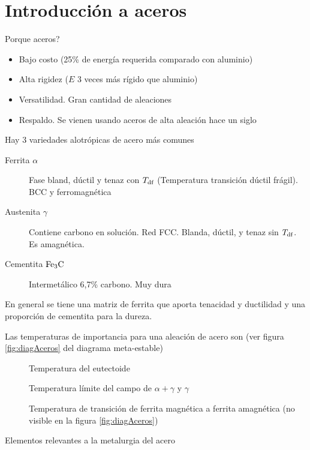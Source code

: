 \section{Introducción a aceros}

Porque aceros?

\begin{itemize}
	\item Bajo costo (25\% de energía requerida comparado con aluminio)
	\item Alta rigidez ($E$ 3 veces más rígido que aluminio)
	\item Versatilidad. Gran cantidad de aleaciones
	\item Respaldo. Se vienen usando aceros de alta aleación hace un siglo
\end{itemize}

Hay 3 variedades alotrópicas de acero más comunes
\begin{description}
	\item[Ferrita $\alpha$] Fase bland, dúctil y tenaz con $T_{\mathrm{df}}$ (Temperatura transición dúctil frágil). BCC y ferromagnética
	\item[Austenita $\gamma$] Contiene carbono en solución. Red FCC. Blanda, dúctil, y tenaz sin $T_{\mathrm{df}}$. Es amagnética.
	\item[Cementita $\mathrm{Fe}_3 \mathrm{C}$] Intermetálico 6,7\% carbono. Muy dura   
\end{description}

En general se tiene una matriz de ferrita que aporta tenacidad y ductilidad y una proporción de cementita para la dureza.

Las temperaturas de importancia para una aleación de acero son (ver figura \ref{fig:diagAceros} del diagrama meta-estable)

\begin{description}
	\item[\Aone] Temperatura del eutectoide
	\item[\Athree] Temperatura límite del campo de $\alpha + \gamma$ y $\gamma$
	\item[\Atwo] Temperatura de transición de ferrita magnética a ferrita amagnética  (no visible en la figura \ref{fig:diagAceros})
\end{description}

Elementos relevantes a la metalurgia del acero

